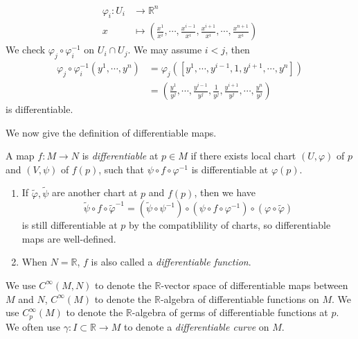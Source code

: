 \begin{eg}
\begin{enumerate}[(1)]
        \begin{align*}
            \varphi_i:U_i&\to\mathbb{R}^n\\
            x&\mapsto\left(\frac{x^1}{x^i},\cdots,\frac{x^{i-1}}{x^i},\frac{x^{i+1}}{x^i},\cdots,\frac{x^{n+1}}{x^i}\right)
        \end{align*}
        We check $\varphi_j\circ\varphi_i^{-1}$ on $U_i\cap U_j$.
        We may assume $i<j$, then
        \begin{align*}
            \varphi_j\circ\varphi_i^{-1}(y^1,\cdots,y^n)&=\varphi_j\left([y^1,\cdots,y^{i-1},1,y^{i+1},\cdots,y^n]\right)\\
            &=\left(\frac{y^1}{y^j},\cdots,\frac{y^{i-1}}{y^j},\frac{1}{y^j},\frac{y^{i+1}}{y^j},\cdots,\frac{y^n}{y^j}\right)
        \end{align*}
        is differentiable.
    \end{enumerate}
\end{eg}

We now give the definition of differentiable maps.
\begin{defn}
    A map $f:M\to N$ is \emph{differentiable} at $p\in M$ if there exists local chart $(U,\varphi)$ of $p$ and $(V,\psi)$ of $f(p)$, such that $\psi\circ f\circ\varphi^{-1}$ is differentiable at $\varphi(p)$.
\end{defn}

\begin{rem}
    \begin{enumerate}[(1)]
        \item If $\tilde{\varphi},\tilde{\psi}$ are another chart at $p$ and $f(p)$, then we have
        \[\tilde{\psi}\circ f\circ\tilde{\varphi}^{-1}=(\tilde{\psi}\circ\psi^{-1})\circ(\psi\circ f\circ\varphi^{-1})\circ(\varphi\circ\tilde{\varphi})\]
        is still differentiable at $p$ by the compatiblility of charts, so differentiable maps are well-defined.
        \item When $N=\mathbb{R}$, $f$ is also called a \emph{differentiable function}. 
    \end{enumerate}
\end{rem}

\begin{symb}
    We use $C^\infty(M,N)$ to denote the $\mathbb{R}$-vector space of differentiable maps between $M$ and $N$,
    $C^\infty(M)$ to denote the $\mathbb{R}$-algebra of differentiable functions on $M$.
    We use $C^\infty_p(M)$ to denote the $\mathbb{R}$-algebra of germs of differentiable functions at $p$.
    We often use $\gamma:I\subset\mathbb{R}\to M$ to denote a \emph{differentiable curve} on $M$.
\end{symb}

